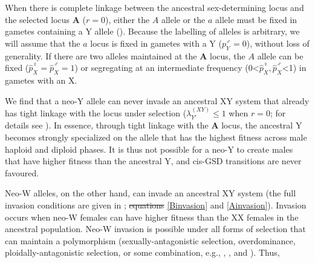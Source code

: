 \documentclass[10pt,letterpaper]{article}
\providecommand{\DIFadd}[1]{{\protect\color{blue}\uwave{#1}}} %
\providecommand{\DIFdel}[1]{{\protect\color{red}\sout{#1}}}                      %
\providecommand{\DIFaddbegin}{} %
\providecommand{\DIFaddend}{} %
\providecommand{\DIFdelbegin}{} %
\providecommand{\DIFdelend}{} %
\begin{document}
When there is complete linkage between the ancestral sex-determining locus and the selected locus $\mathbf{A}$ ($r=0$), either the $A$ allele or the $a$ allele must be fixed in gametes containing a Y allele (). 
Because the labelling of alleles is arbitrary, we will assume that the $a$ locus is fixed in gametes with a Y ($p^\male_Y=0$), without loss of generality. 
If there are two alleles maintained at the $\mathbf{A}$ locus, the $A$ allele can be fixed ($\hat{p}^\female_X=\hat{p}^\male_X=1$) or segregating at an intermediate frequency (0<$\hat{p}^\female_X, \hat{p}^\male_X$<1) in gametes with an X. 

We find that a neo-Y allele can never invade an ancestral XY system that already has tight linkage with the locus under selection ($\lambda_{Y'}^{(XY)} \leq 1$ when $r=0$; for details see ). 
In essence, through tight linkage with the $\mathbf{A}$ locus, the ancestral Y becomes strongly specialized on the allele that has the highest fitness across male haploid and diploid phases. 
It is thus not possible for a neo-Y to create males that have higher fitness than the ancestral Y, and cis-GSD transitions are never favoured. 

Neo-W alleles, on the other hand, can invade an ancestral XY system (the full invasion conditions are given in ; \DIFdelbegin \DIFdel{equations }\DIFdelend \DIFaddbegin \DIFadd{Eqs }\DIFaddend \ref{Binvasion} and \ref{Ainvasion}).
Invasion occurs when neo-W females can have higher fitness than the XX females in the ancestral population.
Neo-W invasion is possible under all forms of selection that can maintain a polymorphism (sexually-antagonistic selection, overdominance, ploidally-antagonistic selection, or some combination, e.g., , , and ). Thus, 
\vspace{0.5cm}
\end{document}
